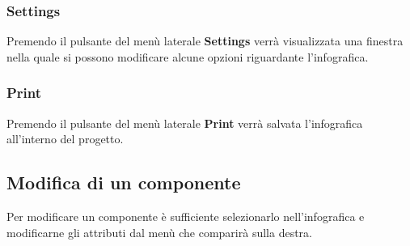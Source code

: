 \subsubsection{Settings}
Premendo il pulsante del menù laterale \textbf{Settings} verrà visualizzata una finestra nella quale si possono modificare alcune opzioni riguardante l'infografica.
\subsubsection{Print}
Premendo il pulsante del menù laterale \textbf{Print} verrà salvata l'infografica all'interno del progetto.

\subsection{Modifica di un componente}
Per modificare un componente è sufficiente selezionarlo nell'infografica e modificarne gli attributi dal menù che comparirà sulla destra.
